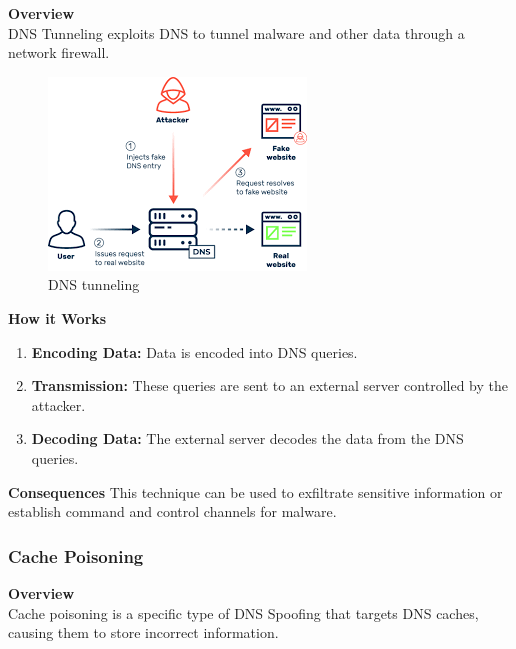 \textbf{Overview\\}
DNS Tunneling exploits DNS to tunnel malware and other data through a network firewall.

\begin{figure}[ht!]
	\centering
	\includegraphics[width=0.5\linewidth]{chap1/images/dns spoofing.png}
	\caption{DNS tunneling \cite{cloudacademy2023dns}}
	\label{fig:enter-label}
\end{figure}

\textbf{How it Works}
\begin{enumerate}
	\item \textbf{Encoding Data:} Data is encoded into DNS queries.
	\item \textbf{Transmission:} These queries are sent to an external server controlled by the attacker.
	\item \textbf{Decoding Data:} The external server decodes the data from the DNS queries.
\end{enumerate}

\textbf{Consequences}
This technique can be used to exfiltrate sensitive information or establish command and control channels for malware.

\subsubsection{Cache Poisoning}
\textbf{Overview\\}
Cache poisoning is a specific type of DNS Spoofing that targets DNS caches, causing them to store incorrect information.

